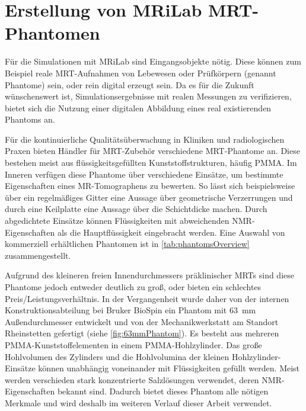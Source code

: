 









\section{Erstellung von MRiLab MRT-Phantomen}
Für die Simulationen mit MRiLab sind Eingangsobjekte nötig. Diese können zum Beispiel reale MRT-Aufnahmen von Lebewesen oder Prüfkörpern (genannt Phantome) sein, oder rein digital erzeugt sein. Da es für die Zukunft wünschenswert ist, Simulationsergebnisse mit realen Messungen zu verifizieren, bietet sich die Nutzung einer digitalen Abbildung eines real existierenden Phantoms an.

Für die kontinuierliche Qualitätsüberwachung in Kliniken und radiologischen Praxen bieten Händler für MRT-Zubehör verschiedene MRT-Phantome an. Diese bestehen meist aus flüssigkeitsgefüllten Kunststoffstrukturen, häufig PMMA. Im Inneren verfügen diese Phantome über verschiedene Einsätze, um bestimmte Eigenschaften eines MR-Tomographens zu bewerten. So lässt sich beispielsweise über ein regelmäßiges Gitter eine Aussage über geometrische Verzerrungen und durch eine Keilplatte eine Aussage über die Schichtdicke machen. Durch abgedichtete Einsätze können Flüssigkeiten mit abweichenden NMR-Eigenschaften als die Hauptflüssigkeit eingebracht werden. Eine Auswahl von kommerziell erhältlichen Phantomen ist in \autoref{tab:phantomsOverview} zusammengestellt.

Aufgrund des kleineren freien Innendurchmessers präklinischer MRTs sind diese Phantome jedoch entweder deutlich zu groß, oder bieten ein schlechtes Preis/Leistungsverhältnis. In der Vergangenheit wurde daher von der internen Konstruktionsabteilung bei Bruker BioSpin ein Phantom mit \SI{63}{\mm} Außendurchmesser entwickelt und von der Mechanikwerkstatt am Standort Rheinstetten gefertigt (siehe \autoref{fig:63mmPhantom}). Es besteht aus mehreren PMMA-Kunststoffelementen in einem PMMA-Hohlzylinder. Das große Hohlvolumen des Zylinders und die Hohlvolumina der kleinen Hohlzylinder-Einsätze können unabhängig voneinander mit Flüssigkeiten gefüllt werden. Meist werden verschieden stark konzentrierte Salzlösungen verwendet, deren NMR-Eigenschaften bekannt sind. Dadurch bietet dieses Phantom alle nötigen Merkmale und wird deshalb im weiteren Verlauf dieser Arbeit verwendet.


